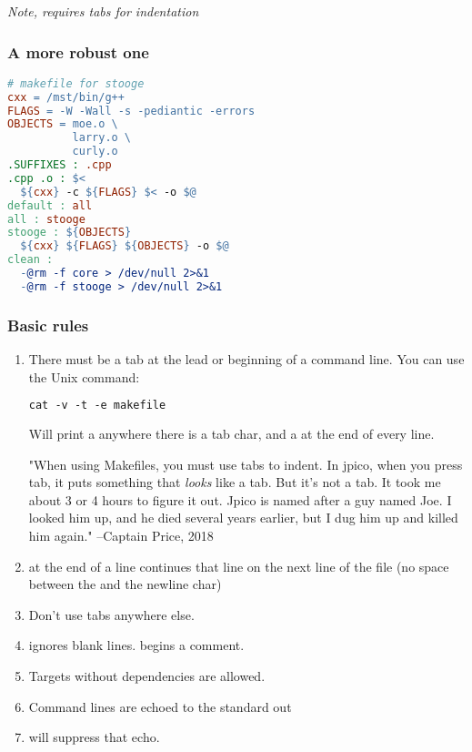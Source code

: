 \textit{Note, requires tabs for indentation}

\subsubsection{A more robust one}

\begin{lstlisting}[language=make]
# makefile for stooge
cxx = /mst/bin/g++
FLAGS = -W -Wall -s -pediantic -errors
OBJECTS = moe.o \
          larry.o \
          curly.o
.SUFFIXES : .cpp
.cpp .o : $<
  ${cxx} -c ${FLAGS} $< -o $@
default : all
all : stooge
stooge : ${OBJECTS}
  ${cxx} ${FLAGS} ${OBJECTS} -o $@
clean : 
  -@rm -f core > /dev/null 2>&1
  -@rm -f stooge > /dev/null 2>&1
\end{lstlisting}

\subsubsection{Basic rules}

\begin{enumerate}
  \item There must be a tab at the lead or beginning of a command line. You can use the Unix command:

\begin{lstlisting}[language=make]
cat -v -t -e makefile
\end{lstlisting}

  Will print a  anywhere there is a tab char, and a \shellcmd{\$} at the end of every line.

  "When using Makefiles, you must use tabs to indent. In jpico, when you press tab, it puts something that \textit{looks} like a tab. But it's not a tab. It took me about 3 or 4 hours to figure it out. Jpico is named after a guy named Joe. I looked him up, and he died several years earlier, but I dug him up and killed him again." --Captain Price, 2018

  \item \shellcmd{\textbackslash} at the end of a line continues that line on the next line of the file (no space between the \shellcmd{\textbackslash} and the newline char)
  \item Don't use tabs anywhere else.
  \item \shellcmd{make} ignores blank lines. \shellcmd{\#} begins a comment. 
  \item Targets without dependencies are allowed.
  \item Command lines are echoed to the standard out
  \item \shellcmd{-@} will suppress that echo.
\end{enumerate}

